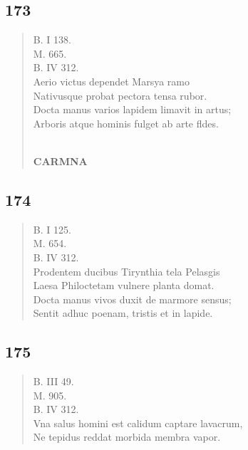 \documentclass[11pt, a4paper]{report}
\begin{document}
            \subsection*{173}
      \begin{verse}
      B. I 138. \\ M. 665. \\ B. IV 312. \\ Aerio victus dependet Marsya ramo \\ Nativusque probat pectora tensa rubor. \\ Docta manus varios lapidem limavit in artus; \\ Arboris atque hominis fulget ab arte fldes. \\ 
        ﻿\pagebreak 
    \begin{center} \textbf{CARMNA} \end{center} \marginpar{[152]} 
      \end{verse}
  
            \subsection*{174}
      \begin{verse}
      B. I 125. \\ M. 654. \\ B. IV 312. \\ Prodentem ducibus Tirynthia tela Pelasgis \\ Laesa Philoctetam vulnere planta domat. \\ Docta manus vivos duxit de marmore sensus; \\ Sentit adhuc poenam, tristis et in lapide. \\ 
      \end{verse}
  
            \subsection*{175}
      \begin{verse}
      B. III 49. \\ M. 905. \\ B. IV 312. \\ Vna salus homini est calidum captare lavacrum, \\ Ne tepidus reddat morbida membra vapor. \\ 
      \end{verse}
  
\end{document}
